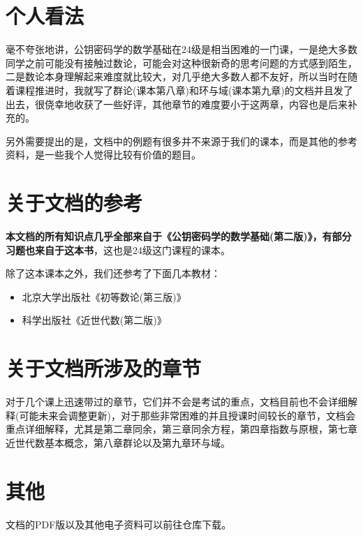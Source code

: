 \documentclass[12pt, a4paper, oneside]{ctexart}
\begin{document}
\section*{个人看法}

毫不夸张地讲，公钥密码学的数学基础在24级是相当困难的一门课，一是绝大多数同学之前可能没有接触过数论，可能会对这种很新奇的思考问题的方式感到陌生，二是数论本身理解起来难度就比较大，对几乎绝大多数人都不友好，所以当时在随着课程推进时，我就写了群论(课本第八章)和环与域(课本第九章)的文档并且发了出去，很侥幸地收获了一些好评，其他章节的难度要小于这两章，内容也是后来补充的。

另外需要提出的是，文档中的例题有很多并不来源于我们的课本，而是其他的参考资料，是一些我个人觉得比较有价值的题目。
\section*{关于文档的参考}

\textbf{本文档的所有知识点几乎全部来自于《公钥密码学的数学基础(第二版)》，有部分习题也来自于这本书}，这也是24级这门课程的课本。

除了这本课本之外，我们还参考了下面几本教材：
\begin{itemize}
    \item 北京大学出版社《初等数论(第三版)》
    \item 科学出版社《近世代数(第二版)》
\end{itemize}

\section*{关于文档所涉及的章节}

对于几个课上迅速带过的章节，它们并不会是考试的重点，文档目前也不会详细解释(可能未来会调整更新)，对于那些非常困难的并且授课时间较长的章节，文档会重点详细解释，尤其是第二章同余，第三章同余方程，第四章指数与原根，第七章近世代数基本概念，第八章群论以及第九章环与域。

\section*{其他}

文档的PDF版以及其他电子资料可以前往仓库下载。
\end{document}
